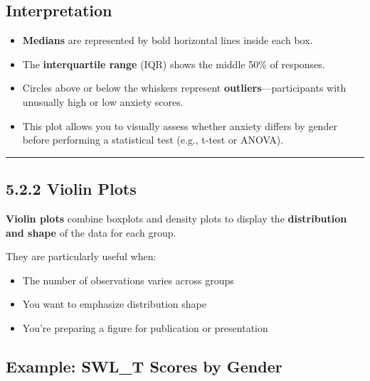 \documentclass[
]{book}
\providecommand{\tightlist}{%
  \setlength{\itemsep}{0pt}\setlength{\parskip}{0pt}}
\begin{document}
\subsection{Interpretation}\label{interpretation-9}

\begin{itemize}
\tightlist
\item
  \textbf{Medians} are represented by bold horizontal lines inside each box.
\item
  The \textbf{interquartile range} (IQR) shows the middle 50\% of responses.
\item
  Circles above or below the whiskers represent \textbf{outliers}---participants with unusually high or low anxiety scores.
\item
  This plot allows you to visually assess whether anxiety differs by gender before performing a statistical test (e.g., t-test or ANOVA).
\end{itemize}

\begin{center}\rule{0.5\linewidth}{0.5pt}\end{center}

\subsection{5.2.2 Violin Plots}\label{violin-plots}

\textbf{Violin plots} combine boxplots and density plots to display the \textbf{distribution and shape} of the data for each group.

They are particularly useful when:

\begin{itemize}
\tightlist
\item
  The number of observations varies across groups
\item
  You want to emphasize distribution shape
\item
  You're preparing a figure for publication or presentation
\end{itemize}

\subsection{Example: SWL\_T Scores by Gender}\label{example-swl_t-scores-by-gender}
\end{document}
